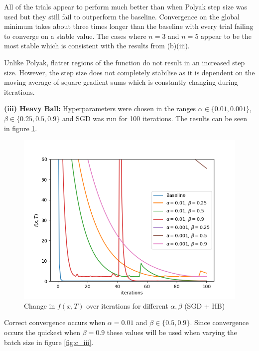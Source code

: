 \documentclass[12pt]{article}
\begin{document}
All of the trials appear to perform much better than when Polyak step size was used but they still fail to outperform the baseline. Convergence on the global minimum takes about three times longer than the baseline with every trial failing to converge on a stable value. The cases where $n=3$ and $n=5$ appear to be the most stable which is consistent with the results from (b)(iii).

Unlike Polyak, flatter regions of the function do not result in an increased step size. However, the step size does not completely stabilise as it is dependent on the moving average of square gradient sums which is constantly changing during iterations.

\vspace{3mm}
\noindent \textbf{(iii) Heavy Ball:} Hyperparameters were chosen in the ranges $\alpha \in \{0.01, 0.001\}$, $\beta \in \{0.25,0.5,0.9\}$ and SGD was run for 100 iterations. The results can be seen in figure \ref{fig:c_iii_params}.

\begin{figure}[h]
    \centering
    \includegraphics[scale=0.6]{figs/c/c_iii_params.png}
    \caption{Change in $f(x, T)$ over iterations for different $\alpha,\beta$ (SGD + HB)}
    \label{fig:c_iii_params}
\end{figure}

Correct convergence occurs when $\alpha=0.01$ and $\beta \in \{0.5,0.9\}$. Since convergence occurs the quickest when $\beta=0.9$ these values will be used when varying the batch size in figure \ref{fig:c_iii}.
\end{document}
